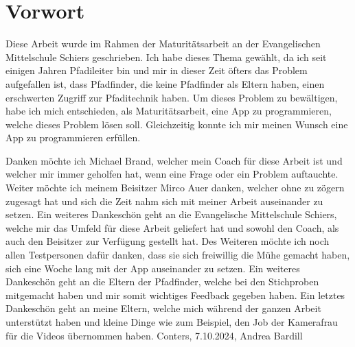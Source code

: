 \chapter*{Vorwort}

Diese Arbeit wurde im Rahmen der Maturitätsarbeit an der Evangelischen Mittelschule Schiers geschrieben. Ich habe dieses Thema gewählt, da ich seit einigen Jahren Pfadileiter bin und mir in dieser Zeit öfters das Problem aufgefallen ist, dass Pfadfinder, die keine Pfadfinder als Eltern haben, einen erschwerten Zugriff zur Pfaditechnik haben. Um dieses Problem zu bewältigen, habe ich mich entschieden, als Maturitätsarbeit, eine App zu programmieren, welche dieses Problem lösen soll. Gleichzeitig konnte ich mir meinen Wunsch eine App zu programmieren erfüllen. \par
Danken möchte ich Michael Brand, welcher mein Coach für diese Arbeit ist und welcher mir immer geholfen hat, wenn eine Frage oder ein Problem auftauchte. Weiter möchte ich meinem Beisitzer Mirco Auer danken, welcher ohne zu zögern zugesagt hat und sich die Zeit nahm sich mit meiner Arbeit auseinander zu setzen. Ein weiteres Dankeschön geht an die Evangelische Mittelschule Schiers, welche mir das Umfeld für diese Arbeit geliefert hat und sowohl den Coach, als auch den Beisitzer zur Verfügung gestellt hat. Des Weiteren möchte ich noch allen Testpersonen dafür danken, dass sie sich freiwillig die Mühe gemacht haben, sich eine Woche lang mit der App auseinander zu setzen. Ein weiteres Dankeschön geht an die Eltern der Pfadfinder, welche bei den Stichproben mitgemacht haben und mir somit wichtiges Feedback gegeben haben. Ein letztes Dankeschön geht an meine Eltern, welche mich während der ganzen Arbeit unterstützt haben und kleine Dinge wie zum Beispiel, den Job der Kamerafrau für die Videos übernommen haben. 
\vfill
\noindent
Conters, 7.10.2024, Andrea Bardill